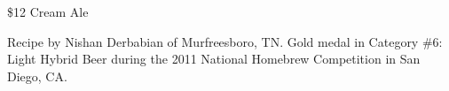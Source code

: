 \stylesection{\stylecreamale}

\begin{recipe}{\$12 Cream Ale}

\begin{aboutblock}
Recipe by Nishan Derbabian of Murfreesboro, TN. Gold medal in Category \#6: Light
Hybrid Beer during the 2011 National Homebrew Competition in San Diego, CA.
\sourceaha
\end{aboutblock}


\begin{methodandtiming}

\begin{mashsteps}
\end{mashsteps}

\begin{fermentationsteps}
\end{fermentationsteps}

\end{methodandtiming}

\recipebreak

\begin{ingredientsblock}

\begin{malts}
\end{malts}

\begin{hops}
\end{hops}


\end{ingredientsblock}

\end{recipe}

